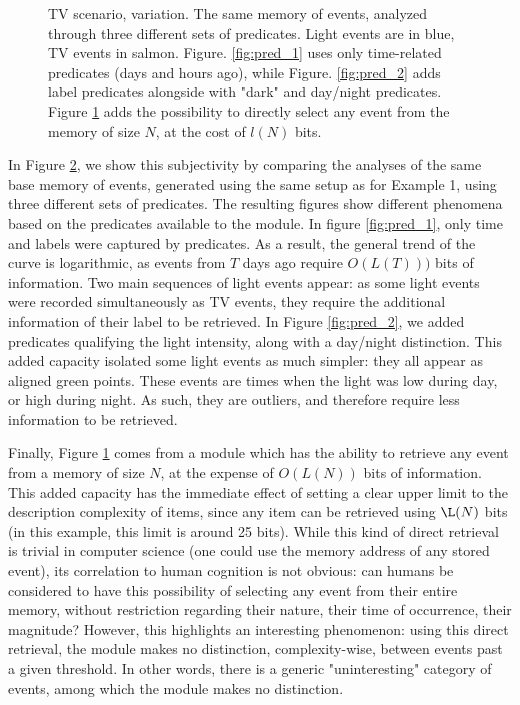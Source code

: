 \documentclass[entropy,article,submit,moreauthors,pdftex]{Definitions/mdpi}
\begin{document}
\begin{figure}[!ht]
\begin{subfigure}{\linewidth}
        \caption{}
        \label{fig:pred_3}
    \end{subfigure}
    \caption{TV scenario, variation. The same memory of events, analyzed through three different sets of predicates. Light events are in blue, TV events in salmon. Figure. \ref{fig:pred_1} uses only time-related predicates (days and hours ago), while Figure. \ref{fig:pred_2} adds label predicates alongside with "dark" and day/night predicates. Figure \ref{fig:pred_3} adds the possibility to directly select any event from the memory of size $N$, at the cost of $l(N)$ bits.}
    \label{fig:3preds}
\end{figure}

In Figure \ref{fig:3preds}, we show this subjectivity by comparing the analyses of the same base memory of events, generated using the same setup as for Example 1, using three different sets of predicates. The resulting figures show different phenomena based on the predicates available to the module. In figure \ref{fig:pred_1}, only time and labels were captured by predicates. As a result, the general trend of the curve is logarithmic, as events from $T$ days ago require $O(L(T)))$ bits of information. Two main sequences of light events appear: as some light events were recorded simultaneously as TV events, they require the additional information of their label to be retrieved. In Figure \ref{fig:pred_2}, we added predicates qualifying the light intensity, along with a day/night distinction. This added capacity isolated some light events as much simpler: they all appear as aligned green points. These events are times when the light was low during day, or high during night. As such, they are outliers, and therefore require less information to be retrieved.

Finally, Figure \ref{fig:pred_3} comes from a module which has the ability to retrieve any event from a memory of size $N$, at the expense of $O(L(N))$ bits of information. This added capacity has the immediate effect of setting a clear upper limit to the description complexity of items, since any item can be retrieved using $\L(N)$ bits (in this example, this limit is around 25 bits). While this kind of direct retrieval is trivial in computer science (one could use the memory address of any stored event), its correlation to human cognition is not obvious: can humans be considered to have this possibility of selecting any event from their entire memory, without restriction regarding their nature, their time of occurrence, their magnitude? However, this highlights an interesting phenomenon: using this direct retrieval, the module makes no distinction, complexity-wise, between events past a given threshold. In other words, there is a generic "uninteresting" category of events, among which the module makes no distinction.
\end{document}
